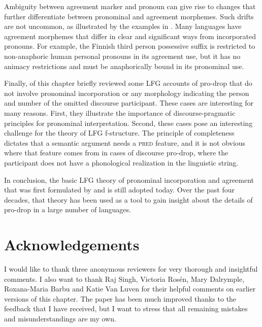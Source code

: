\documentclass[output=paper,hidelinks]{langscibook}
\begin{document}
Ambiguity between agreement marker and pronoun  can give rise to  changes that further differentiate between   pronominal and agreement morphemes.   Such drifts are not uncommon, as illustrated by the examples in .  Many languages have agreement morphemes that differ in clear and significant ways from incorporated pronouns.  For example, the Finnish third person possessive suffix is restricted to non-anaphoric human personal pronouns in its agreement use, but it has no animacy restrictions and must be anaphorically bound in its pronominal use.

Finally,  of this chapter briefly reviewed some LFG accounts of pro-drop that do not involve pronominal incorporation or any morphology indicating the person and number of the omitted discourse participant. These cases are interesting for many reasons. First, they illustrate the importance of discourse-pragmatic principles for pronominal  interpretation.  Second,    these cases pose an interesting challenge  for the theory of LFG f-structure. The principle of completeness dictates that a semantic argument needs a \textsc{pred} feature, and  it is not obvious where that feature comes from in cases of discourse pro-drop, where the participant  does not  have a phonological realization in the linguistic string.  

In conclusion, the basic  LFG theory of pronominal incorporation and agreement that was first formulated by \citet{FassiFehri1984,FF} and \citet{BM87} is still adopted today. Over the past  four decades, that theory has  been used as a tool to gain insight about the details of pro-drop in a large number of languages. 

\section*{Acknowledgements}
I would like to thank three anonymous reviewers for very thorough and insightful comments. I also want to thank Raj Singh,     Victoria Ros\'{e}n,  Mary Dalrymple, Roxana-Maria  Barbu and Katie Van Luven for their helpful comments on earlier versions of this chapter.  The paper has been much improved thanks to the feedback that I have received, but  I want to stress that all remaining mistakes and misunderstandings are my own. 
 

\sloppy
\printbibliography[heading=subbibliography,notkeyword=this]
 
\end{document}
